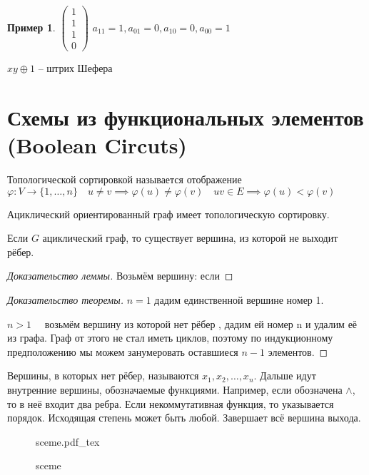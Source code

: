 \documentclass{book}
\theoremstyle{definition}
\newtheorem*{example}{Пример}
\newcommand{\incfig}[1]{%
    \def\svgwidth{\columnwidth}
    {#1.pdf_tex}
}
\begin{document}
\begin{example}
    $  \begin{pmatrix}1\\1\\1\\0  \end{pmatrix} $
        $a_{11}=1, a_{01}=0, a_{10}=0, a_{00} = 1$

        $xy\oplus 1$ -- штрих Шефера
\end{example}

\section{Схемы из функциональных элементов (Boolean Circuts)}

\begin{definition}
    Топологической сортировкой называется отображение $\varphi:V \to  \{1, \ldots, n\}\quad u\neq v \implies  \varphi(u)\neq \varphi(v)\quad uv\in E \implies  \varphi(u)<\varphi(v)$
\end{definition}

\begin{theorem}
    Ациклический ориентированный граф имеет топологическую сортировку.
\end{theorem}
\begin{lemma}
    Если $G$ ациклический граф, то существует вершина, из которой не выходит рёбер.
\end{lemma}
\begin{proof}
    [Доказательство леммы]
    Возьмём вершину: если 

\end{proof}
\begin{proof}
    [Доказательство теоремы]

   $n=1$ дадим единственной вершине номер 1.

   $n>1\quad $ возьмём вершину из которой нет рёбер , дадим ей номер n и удалим её из графа. Граф от этого не стал иметь циклов, поэтому по индукционному предположению мы можем занумеровать оставшиеся $n-1$ элементов.
\end{proof}

Вершины, в которых нет рёбер, называются $x_1, x_2, \ldots, x_{n} $. Дальше идут внутренние вершины, обозначаемые функциями. Например, если обозначена $\land$, то в неё входит два ребра. Если некоммутативная функция, то указывается порядок. Исходящая степень может быть любой. Завершает всё вершина выхода.

\begin{figure}[ht]
    \centering
    \incfig{sceme}
    \caption{sceme}
    \label{fig:sceme}
\end{figure}
\end{document}
